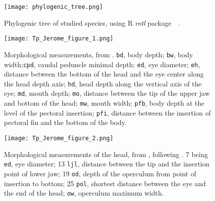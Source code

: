 
\renewcommand\thefigure{\thesection.\arabic{figure}}
\setcounter{figure}{0}

\begin{figure} [!htbp]
	\begin{center}
		\texttt{[image: phylogenic\_tree.png]}
	\end{center}
	\caption[Phylogenic tree of studied species]{Phylogenic tree of studied species, using R \emph{rotl} package~\citep{opentreeoflife2019}~.}
	\label{fig:phylotree}
\end{figure}


\begin{figure} [!htbp]
	\begin{center}
		\texttt{[image: Tp\_Jerome\_figure\_1.png]}
		\caption[Body morphological measurements]{Morphological measurements, from \citet{albouy2011}. \texttt{bd}, body depth; \texttt{bw}, body width;\texttt{cpd}, caudal peduncle minimal depth; \texttt{ed}, eye diameter; \texttt{eh}, distance between the bottom of the head and the eye center along the head depth axis; \texttt{hd}, head depth along the vertical axis of the eye; \texttt{md}, mouth depth; \texttt{mo}, distance between the tip of the upper jaw and bottom of the head; \texttt{mw}, mouth width; \texttt{pfb}, body depth at the level of the pectoral insertion; \texttt{pfi}, distance between the insertion of pectoral fin and the bottom of the body.}
	\label{fig:full_body}
	\end{center}
\end{figure}


\begin{figure} [!htbp]
	\begin{center}
		\texttt{[image: Tp\_Jerome\_figure\_2.png]}
		\caption[Head morphological measurements]{Morphological measurements of the head, from \citet{diderich2006}, following \citet{sibbing2000}. 7 being \texttt{ed}, eye diameter; 13 \texttt{ljl}, distance between the tip and the insertion point of lower jaw; 19 \texttt{od}, depth of the operculum from point of insertion to bottom; 25 \texttt{pol}, shortest distance between the eye and the end of the head; \texttt{ow}, operculum maximum width.}
	\label{fig:head}
	\end{center}
	
\end{figure}


